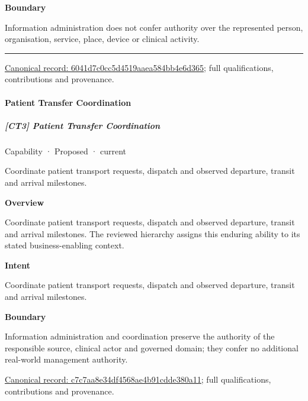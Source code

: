 \textbf{Boundary}



Information administration does not confer authority over the represented person, organisation, service, place, device or clinical activity.



\medskip\hrule\medskip

{\footnotesize \href{../../../../continuum/strategy/capability/6041d7c0cc5d4519aaea584bb4e6d365.md}{Canonical record: 6041d7c0cc5d4519aaea584bb4e6d365}; full qualifications, contributions and provenance.}\par
\paragraph{Patient Transfer Coordination}

\subparagraph{[CT3] Patient Transfer Coordination}

\label{element:c7c7aa8e34df4568ae4b91cdde380a11}
{\small Capability · Proposed · current}\par

Coordinate patient transport requests, dispatch and observed departure, transit and arrival milestones.



\textbf{Overview}



Coordinate patient transport requests, dispatch and observed departure, transit and arrival milestones. The reviewed hierarchy assigns this enduring ability to its stated business-enabling context.



\textbf{Intent}



Coordinate patient transport requests, dispatch and observed departure, transit and arrival milestones.



\textbf{Boundary}



Information administration and coordination preserve the authority of the responsible source, clinical actor and governed domain; they confer no additional real-world management authority.


{\footnotesize \href{../../../../continuum/strategy/capability/c7c7aa8e34df4568ae4b91cdde380a11.md}{Canonical record: c7c7aa8e34df4568ae4b91cdde380a11}; full qualifications, contributions and provenance.}\par
